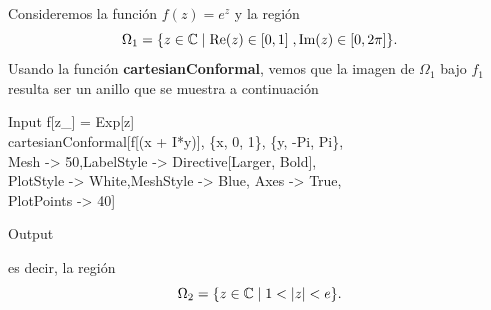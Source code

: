 \begin{Ejem}
	

Consideremos la función $f(z)=e^z$ y la región $$\Omega_{1}=\{z\in \mathbb{C} \mid \mbox{Re}(z)\in [0,1]\;, \mbox{Im}(z)\in [0,2\pi]\}.$$
Usando la función \textbf{cartesianConformal}, vemos que la imagen de $\Omega_{1}$ bajo $f_1$ resulta ser un anillo que se muestra a continuación
\begin{mmaCell}{Input}
	 f[z_] = Exp[z] \\cartesianConformal[f[(x + I*y)], \{x, 0, 1\}, \{y, -Pi, Pi\},\\Mesh -> 50,LabelStyle -> Directive[Larger, Bold],\\PlotStyle -> White,MeshStyle -> Blue, Axes -> True,\\PlotPoints -> 40]
\end{mmaCell}
\begin{mmaCell}[moregraphics={moreig={scale=0.5}}]{Output}
\end{mmaCell}
es decir, la región 
$$\Omega_{2}=\{z\in \C\mid 1<|z|<e\}.$$
\end{Ejem}


